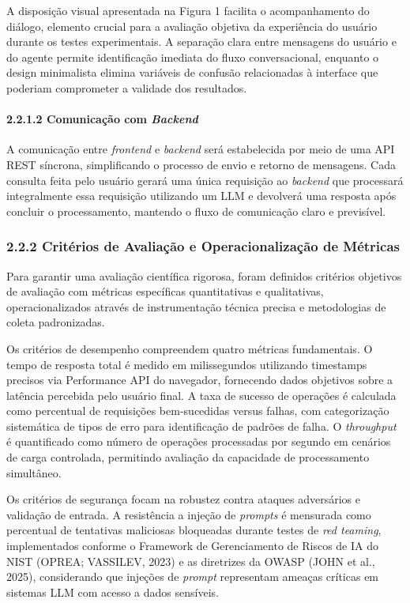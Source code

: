 \documentclass[
]{article}
\begin{document}
A disposição visual apresentada na Figura 1 facilita o acompanhamento do
diálogo, elemento crucial para a avaliação objetiva da experiência do
usuário durante os testes experimentais. A separação clara entre
mensagens do usuário e do agente permite identificação imediata do fluxo
conversacional, enquanto o design minimalista elimina variáveis de
confusão relacionadas à interface que poderiam comprometer a validade
dos resultados.

\paragraph{\texorpdfstring{2.2.1.2 Comunicação com
\emph{Backend}}{2.2.1.2 Comunicação com Backend}}\label{comunicauxe7uxe3o-com-backend}

A comunicação entre \emph{frontend} e \emph{backend} será estabelecida
por meio de uma API REST síncrona, simplificando o processo de envio e
retorno de mensagens. Cada consulta feita pelo usuário gerará uma única
requisição ao \emph{backend} que processará integralmente essa
requisição utilizando um LLM e devolverá uma resposta após concluir o
processamento, mantendo o fluxo de comunicação claro e previsível.

\subsubsection{2.2.2 Critérios de Avaliação e Operacionalização de
Métricas}\label{crituxe9rios-de-avaliauxe7uxe3o-e-operacionalizauxe7uxe3o-de-muxe9tricas}

Para garantir uma avaliação científica rigorosa, foram definidos
critérios objetivos de avaliação com métricas específicas quantitativas
e qualitativas, operacionalizados através de instrumentação técnica
precisa e metodologias de coleta padronizadas.

Os critérios de desempenho compreendem quatro métricas fundamentais. O
tempo de resposta total é medido em milissegundos utilizando timestamps
precisos via Performance API do navegador, fornecendo dados objetivos
sobre a latência percebida pelo usuário final. A taxa de sucesso de
operações é calculada como percentual de requisições bem-sucedidas
versus falhas, com categorização sistemática de tipos de erro para
identificação de padrões de falha. O \emph{throughput} é quantificado
como número de operações processadas por segundo em cenários de carga
controlada, permitindo avaliação da capacidade de processamento
simultâneo.

Os critérios de segurança focam na robustez contra ataques adversários e
validação de entrada. A resistência a injeção de \emph{prompts} é
mensurada como percentual de tentativas maliciosas bloqueadas durante
testes de \emph{red teaming}, implementados conforme o Framework de
Gerenciamento de Riscos de IA do NIST (OPREA; VASSILEV, 2023) e as
diretrizes da OWASP (JOHN et al., 2025), considerando que injeções de
\emph{prompt} representam ameaças críticas em sistemas LLM com acesso a
dados sensíveis.
\end{document}
